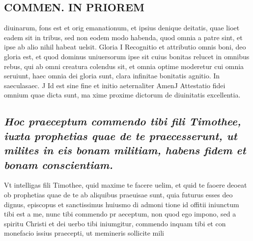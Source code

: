 \documentclass{article}
\begin{document}
\begin{pages}
\section*{COMMEN. IN PRIOREM }
\marginpar{[ p.38 ]}\pstart diuinarum, fons est et orig emanationum, et ipsius denique deitatis, quae lioet eadem sit in tribus, sed non eodem modo habenda, quod omnia a patre sint, et ipse ab alio nihil habeat uelsit.  \pend\pstart Gloria I Recognitio et attributio omnis boni, deo gloria est, et quod dominus uniuersorum ipse sit cuius bonitas relucet in omnibus rebus, qui ab omni creatura colendus sit, et omnia optime moderetur cui omnia seruiunt, haec omnia dei gloria sunt, clara infinitae bonitatis agnitio.  \pend\pstart In saeculasaec. J Id est sine fine et initio aeternaliter AmenJ Attestatio fidei omnium quae dicta sunt, ma xime proxime dictorum de diuinitatis excellentia.  \pend
{}
{}
\subsection*{\textit{Hoc praeceptum commendo tibi fili Timothee, iuxta prophetias quae de te praecesserunt, ut milites in eis bonam militiam, habens fidem et bonam conscientiam. }}\pstart Vt intelligas fili Timothee, quid maxime te facere uelim, et quid te faoere deoeat ob prophetias quae de te ab aliquibus praeuisae sunt, quia futurus esses deo dignus, episcopus et sanctissimus huiusmo di admoni tione id offitii iniunctum tibi est a me, nunc tibi commendo pr aeceptum, non quod ego impono, sed a spiritu Christi et dei uerbo tibi iniumgitur, commendo inquam tibi et con monefacio issius praecepti, ut memineris sollicite mili\pend

\end{pages}
\end{document}
